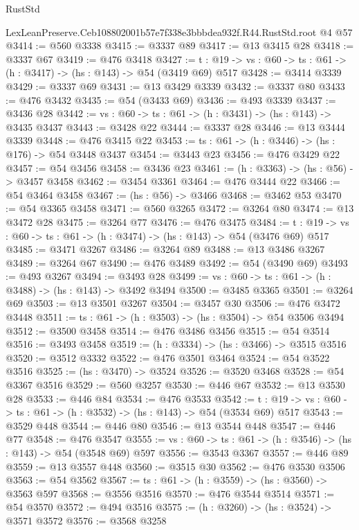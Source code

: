 \begin{lexlean}{RustStd}
\begin{coremodule}
  LexLeanPreserve.Ceb108802001b57e7f338e3bbbdea932f.R44.RustStd.root @4 @57
@3414 := @560 @3338
@3415 := @3337 @89
@3417 := @13 @3415 @28
@3418 := @3337 @67
@3419 := @476 @3418
@3427 := {t : @19} -> {vs : @60} -> {ts : @61} -> (h : @3417) -> (hs : @143) -> @54 (@3419 @69) @517
@3428 := @3414 @3339
@3429 := @3337 @69
@3431 := @13 @3429 @3339
@3432 := @3337 @80
@3433 := @476 @3432
@3435 := @54 (@3433 @69)
@3436 := @493 @3339
@3437 := @3436 @28
@3442 := {vs : @60} -> {ts : @61} -> (h : @3431) -> (hs : @143) -> @3435 @3437
@3443 := @3428 @22
@3444 := @3337 @28
@3446 := @13 @3444 @3339
@3448 := @476 @3415 @22
@3453 := {ts : @61} -> (h : @3446) -> (hs : @176) -> @54 @3448 @3437
@3454 := @3443 @23
@3456 := @476 @3429 @22
@3457 := @54 @3456
@3458 := @3436 @23
@3461 := (h : @3363) -> (hs : @56) -> @3457 @3458
@3462 := @3454 @3361
@3464 := @476 @3444 @22
@3466 := @54 @3464 @3458
@3467 := (hs : @56) -> @3466
@3468 := @3462 @53
@3470 := @54 @3365 @3458
@3471 := @560 @3265
@3472 := @3264 @80
@3474 := @13 @3472 @28
@3475 := @3264 @77
@3476 := @476 @3475
@3484 := {t : @19} -> {vs : @60} -> {ts : @61} -> (h : @3474) -> (hs : @143) -> @54 (@3476 @69) @517
@3485 := @3471 @3267
@3486 := @3264 @89
@3488 := @13 @3486 @3267
@3489 := @3264 @67
@3490 := @476 @3489
@3492 := @54 (@3490 @69)
@3493 := @493 @3267
@3494 := @3493 @28
@3499 := {vs : @60} -> {ts : @61} -> (h : @3488) -> (hs : @143) -> @3492 @3494
@3500 := @3485 @3365
@3501 := @3264 @69
@3503 := @13 @3501 @3267
@3504 := @3457 @30
@3506 := @476 @3472 @3448
@3511 := {ts : @61} -> (h : @3503) -> (hs : @3504) -> @54 @3506 @3494
@3512 := @3500 @3458
@3514 := @476 @3486 @3456
@3515 := @54 @3514
@3516 := @3493 @3458
@3519 := (h : @3334) -> (hs : @3466) -> @3515 @3516
@3520 := @3512 @3332
@3522 := @476 @3501 @3464
@3524 := @54 @3522 @3516
@3525 := (hs : @3470) -> @3524
@3526 := @3520 @3468
@3528 := @54 @3367 @3516
@3529 := @560 @3257
@3530 := @446 @67
@3532 := @13 @3530 @28
@3533 := @446 @84
@3534 := @476 @3533
@3542 := {t : @19} -> {vs : @60} -> {ts : @61} -> (h : @3532) -> (hs : @143) -> @54 (@3534 @69) @517
@3543 := @3529 @448
@3544 := @446 @80
@3546 := @13 @3544 @448
@3547 := @446 @77
@3548 := @476 @3547
@3555 := {vs : @60} -> {ts : @61} -> (h : @3546) -> (hs : @143) -> @54 (@3548 @69) @597
@3556 := @3543 @3367
@3557 := @446 @89
@3559 := @13 @3557 @448
@3560 := @3515 @30
@3562 := @476 @3530 @3506
@3563 := @54 @3562
@3567 := {ts : @61} -> (h : @3559) -> (hs : @3560) -> @3563 @597
@3568 := @3556 @3516
@3570 := @476 @3544 @3514
@3571 := @54 @3570
@3572 := @494 @3516
@3575 := (h : @3260) -> (hs : @3524) -> @3571 @3572
@3576 := @3568 @3258

\end{coremodule}
\end{lexlean}
